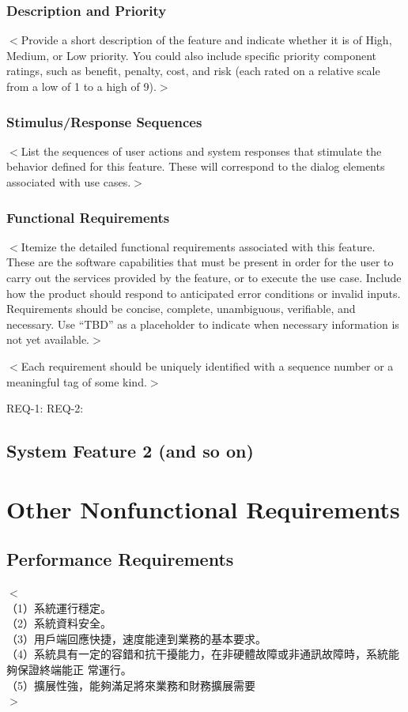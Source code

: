 \documentclass{scrreprt}
\begin{document}
\begin{CJK}{UTF8}{bkai}
\subsection{Description and Priority}
$<$Provide a short description of the feature and indicate whether it is of 
High, Medium, or Low priority. You could also include specific priority 
component ratings, such as benefit, penalty, cost, and risk (each rated on a 
relative scale from a low of 1 to a high of 9).$>$

\subsection{Stimulus/Response Sequences}
$<$List the sequences of user actions and system responses that stimulate the 
behavior defined for this feature. These will correspond to the dialog elements 
associated with use cases.$>$

\subsection{Functional Requirements}
$<$Itemize the detailed functional requirements associated with this feature.  
These are the software capabilities that must be present in order for the user 
to carry out the services provided by the feature, or to execute the use case.  
Include how the product should respond to anticipated error conditions or 
invalid inputs. Requirements should be concise, complete, unambiguous, 
verifiable, and necessary. Use “TBD” as a placeholder to indicate when necessary 
information is not yet available.$>$

$<$Each requirement should be uniquely identified with a sequence number or a 
meaningful tag of some kind.$>$

REQ-1:	REQ-2:

\section{System Feature 2 (and so on)}


\chapter{Other Nonfunctional Requirements}

\section{Performance Requirements}
$<$\\（1）系統運行穩定。 \\
（2）系統資料安全。\\ 
（3）用戶端回應快捷，速度能達到業務的基本要求。\\ （4）系統具有一定的容錯和抗干擾能力，在非硬體故障或非通訊故障時，系統能夠保證終端能正 常運行。\\ （5）擴展性強，能夠滿足將來業務和財務擴展需要\\
$>$



\end{CJK}
\end{document}
